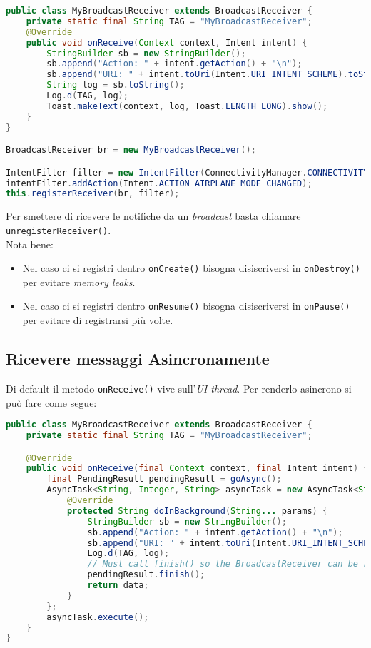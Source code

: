 \begin{lstlisting}[language=Java]
public class MyBroadcastReceiver extends BroadcastReceiver {
    private static final String TAG = "MyBroadcastReceiver";
    @Override
    public void onReceive(Context context, Intent intent) {
        StringBuilder sb = new StringBuilder();
        sb.append("Action: " + intent.getAction() + "\n");
        sb.append("URI: " + intent.toUri(Intent.URI_INTENT_SCHEME).toString() + "\n");
        String log = sb.toString();
        Log.d(TAG, log);
        Toast.makeText(context, log, Toast.LENGTH_LONG).show();
    }
}

BroadcastReceiver br = new MyBroadcastReceiver();

IntentFilter filter = new IntentFilter(ConnectivityManager.CONNECTIVITY_ACTION);
intentFilter.addAction(Intent.ACTION_AIRPLANE_MODE_CHANGED);
this.registerReceiver(br, filter);
\end{lstlisting}

Per smettere di ricevere le notifiche da un \textit{broadcast} basta chiamare \texttt{unregisterReceiver()}.\\
Nota bene:
\begin{itemize}
	\item Nel caso ci si registri dentro \texttt{onCreate()} bisogna disiscriversi in \texttt{onDestroy()} per evitare \textit{memory leaks}.
	\item Nel caso ci si registri dentro \texttt{onResume()} bisogna disiscriversi in \texttt{onPause()} per evitare di registrarsi più volte.
\end{itemize}


\subsection{Ricevere messaggi Asincronamente}
Di default il metodo \texttt{onReceive()} vive sull'\textit{UI-thread}. Per renderlo asincrono si può fare come segue:

\begin{lstlisting}[language=Java]
public class MyBroadcastReceiver extends BroadcastReceiver {
    private static final String TAG = "MyBroadcastReceiver";

    @Override
    public void onReceive(final Context context, final Intent intent) {
        final PendingResult pendingResult = goAsync();
        AsyncTask<String, Integer, String> asyncTask = new AsyncTask<String, Integer, String>() {
            @Override
            protected String doInBackground(String... params) {
                StringBuilder sb = new StringBuilder();
                sb.append("Action: " + intent.getAction() + "\n");
                sb.append("URI: " + intent.toUri(Intent.URI_INTENT_SCHEME).toString() + "\n");
                Log.d(TAG, log);
                // Must call finish() so the BroadcastReceiver can be recycled.
                pendingResult.finish();
                return data;
            }
        };
        asyncTask.execute();
    }
}
\end{lstlisting}


